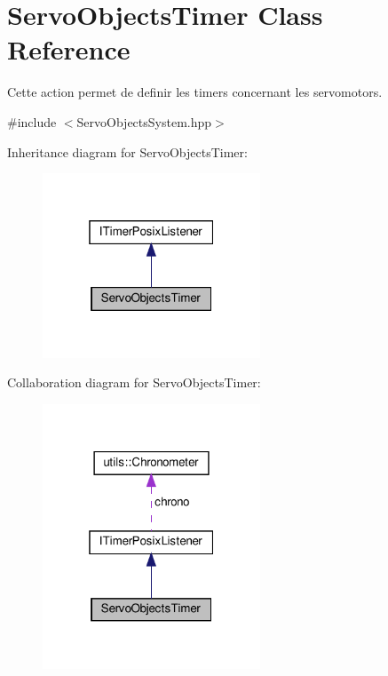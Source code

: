 \hypertarget{classServoObjectsTimer}{}\section{Servo\+Objects\+Timer Class Reference}
\label{classServoObjectsTimer}


Cette action permet de definir les timers concernant les servomotors.  




{\ttfamily \#include $<$Servo\+Objects\+System.\+hpp$>$}



Inheritance diagram for Servo\+Objects\+Timer\+:
\nopagebreak
\begin{figure}[H]
\begin{center}
\leavevmode
\includegraphics[width=184pt]{classServoObjectsTimer__inherit__graph}
\end{center}
\end{figure}


Collaboration diagram for Servo\+Objects\+Timer\+:
\nopagebreak
\begin{figure}[H]
\begin{center}
\leavevmode
\includegraphics[width=184pt]{classServoObjectsTimer__coll__graph}
\end{center}
\end{figure}
